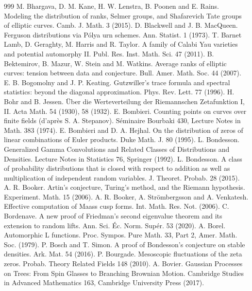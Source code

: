 \begin{thebibliography}{999}
 M. Bhargava, D. M. Kane, H. W. Lenstra, B. Poonen and E. Rains. Modeling the distribution of ranks, Selmer groups, and Shafarevich Tate groups of elliptic curves. Camb. J. Math. 3 (2015).
 D. Blackwell and J. B. MacQueen. Ferguson distributions via P\'olya urn schemes. Ann. Statist. 1 (1973).
 T. Barnet Lamb, D. Geraghty, M. Harris and R. Taylor. A family of Calabi Yau varieties and potential automorphy II. Publ. Res. Inst. Math. Sci. 47 (2011).
 B. Bektemirov, B. Mazur, W. Stein and M. Watkins. Average ranks of elliptic curves: tension between data and conjecture. Bull. Amer. Math. Soc. 44 (2007).
 E. B. Bogomolny and J. P. Keating. Gutzwiller's trace formula and spectral statistics: beyond the diagonal approximation. Phys. Rev. Lett. 77 (1996).
 H. Bohr and B. Jessen. \"Uber die Werteverteilung der Riemannschen Zetafunktion I, II. Acta Math. 54 (1930), 58 (1932).
 E. Bombieri. Counting points on curves over finite fields (d'apr\`es S. A. Stepanov). S\'eminaire Bourbaki 430, Lecture Notes in Math. 383 (1974).
 E. Bombieri and D. A. Hejhal. On the distribution of zeros of linear combinations of Euler products. Duke Math. J. 80 (1995).
 L. Bondesson. Generalized Gamma Convolutions and Related Classes of Distributions and Densities. Lecture Notes in Statistics 76, Springer (1992).
 L. Bondesson. A class of probability distributions that is closed with respect to addition as well as multiplication of independent random variables. J. Theoret. Probab. 28 (2015).
 A. R. Booker. Artin's conjecture, Turing's method, and the Riemann hypothesis. Experiment. Math. 15 (2006).
 A. R. Booker, A. Str\"ombergsson and A. Venkatesh. Effective computation of Maass cusp forms. Int. Math. Res. Not. (2006).
 C. Bordenave. A new proof of Friedman's second eigenvalue theorem and its extension to random lifts. Ann. Sci. \'Ec. Norm. Sup\'er. 53 (2020).
 A. Borel. Automorphic L functions. Proc. Sympos. Pure Math. 33, Part 2, Amer. Math. Soc. (1979).
 P. Bosch and T. Simon. A proof of Bondesson's conjecture on stable densities. Ark. Mat. 54 (2016).
 P. Bourgade. Mesoscopic fluctuations of the zeta zeros. Probab. Theory Related Fields 148 (2010).
 A. Bovier. Gaussian Processes on Trees: From Spin Glasses to Branching Brownian Motion. Cambridge Studies in Advanced Mathematics 163, Cambridge University Press (2017).

\end{thebibliography}
